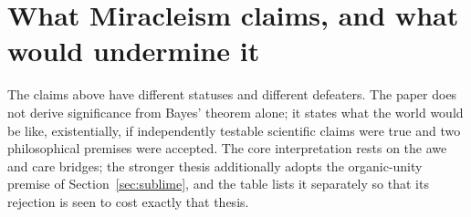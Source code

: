 
\section{What Miracleism claims, and what would undermine it}\label{sec:ladder}

The claims above have different statuses and different defeaters. The paper
does not derive significance from Bayes' theorem alone; it states what the
world would be like, existentially, if independently testable scientific
claims were true and two
philosophical premises were accepted. The core interpretation rests on the
awe and care bridges; the stronger thesis additionally adopts the
organic-unity premise of Section~\ref{sec:sublime}, and the table lists it
separately so that its rejection is seen to cost exactly that thesis.

